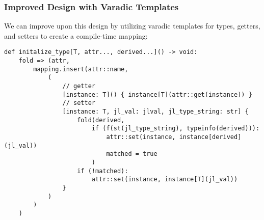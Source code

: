 \begin{frame}[fragile]
    \frametitle{Improved Design with Varadic Templates}
    
    We can improve upon this design by utilizing varadic templates for types, getters, and setters to create a compile-time mapping:
    \pause
\begin{lstlisting}
def initalize_type[T, attr..., derived...]() -> void:
    fold => (attr,
        mapping.insert(attr::name,
            (
                // getter
                [instance: T]() { instance[T](attr::get(instance)) }
                // setter 
                [instance: T, jl_val: jlval, jl_type_string: str] {
                    fold(derived,
                        if (f(st(jl_type_string), typeinfo(derived))):
                            attr::set(instance, instance[derived](jl_val))
                            matched = true
                        )                       
                    if (!matched):
                        attr::set(instance, instance[T](jl_val))
                }
            )
        )
    )

\end{lstlisting}
\end{frame}